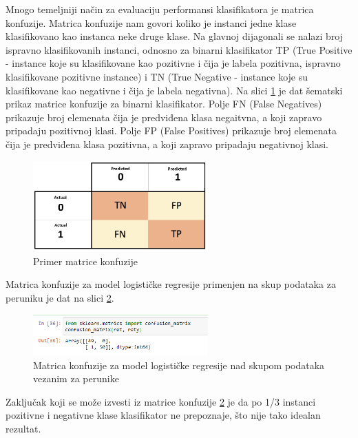 \documentclass[a4paper,12pt]{report}
\begin{document}
Mnogo temeljniji način za evaluaciju performansi klasifikatora je matrica konfuzije. Matrica konfuzije nam govori koliko je instanci jedne klase klasifikovano kao instanca neke druge klase. Na glavnoj dijagonali se nalazi broj ispravno klasifikovanih instanci, odnosno za binarni klasifikator TP (True Positive - instance koje su klasifikovane kao pozitivne i čija je labela pozitivna, ispravno klasifikovane pozitivne instance) i TN (True Negative - 
instance koje su klasifikovane kao negativne i čija je labela negativna). Na slici \ref{fig:confussion} je dat šematski prikaz matrice konfuzije za binarni klasifikator. Polje FN (False Negatives) prikazuje broj elemenata čija je predviđena klasa negaitvna, a koji zapravo pripadaju pozitivnoj klasi.  Polje FP (False Positives) prikazuje broj elemenata čija je predviđena klasa pozitivna, a koji zapravo pripadaju negativnoj klasi.\\

\begin{figure}[h]
    \centering
    \includegraphics[width=0.6\textwidth]{confusion_matrix.jpg}
    \caption{Primer matrice konfuzije}\label{fig:confussion}
\end{figure}

Matrica konfuzije za model logističke regresije primenjen na skup podataka za peruniku je dat na slici \ref{fig:confusioniris}.

\begin{figure}[h]
    \centering
    \includegraphics[width=0.6\textwidth]{logistic_confusion.png}
    \caption{Matrica konfuzije za model logističke regresije nad skupom podataka vezanim za perunike}\label{fig:confusioniris}
\end{figure}

Zaključak koji se može izvesti iz matrice konfuzije \ref{fig:confusioniris} je da po 1/3 instanci pozitivne i negativne klase klasifikator ne prepoznaje, što nije tako idealan rezultat.\\
\end{document}
